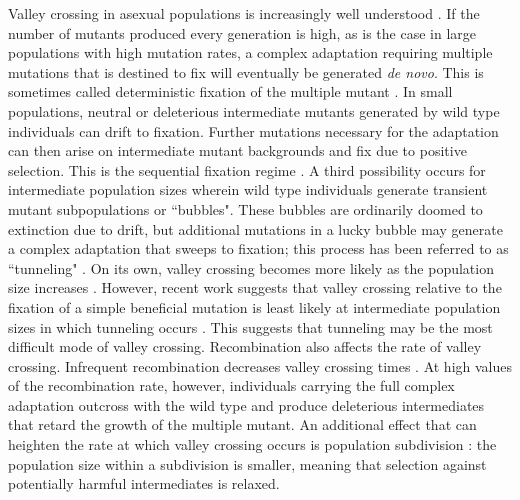 \documentclass[10pt,twocolumn,twoside]{gsajnl}
\begin{document}
\begin{spacing}{1.5}
Valley crossing in asexual populations is increasingly well understood \citep{weissman_2009}.
If the number of mutants produced every generation is high, as is the case in large populations with high mutation rates, a complex adaptation requiring multiple mutations that is destined to fix will eventually be generated \emph{de novo}.
This is sometimes called deterministic fixation of the multiple mutant \citep{weissman_2009}.
In small populations, neutral or deleterious intermediate mutants generated by wild type individuals can drift to fixation. Further mutations necessary for the adaptation can then arise on intermediate mutant backgrounds and fix due to positive selection.
This is the sequential fixation regime \citep{weissman_2009}.
A third possibility occurs for intermediate population sizes wherein wild type individuals generate transient mutant subpopulations or ``bubbles".
These bubbles are ordinarily doomed to extinction due to drift, but additional mutations in a lucky bubble may generate a complex adaptation that sweeps to fixation; this process has been referred to as ``tunneling" \citep{iwasa_2004, weissman_2009}.
On its own, valley crossing becomes more likely as the population size increases \citep{weissman_2009}. However, recent work suggests that valley crossing relative to the fixation of a simple beneficial mutation is least likely at intermediate population sizes in which tunneling occurs \citet{ochs_2015}. This suggests that tunneling may be the most difficult mode of valley crossing. 
Recombination also affects the rate of valley crossing.
Infrequent recombination decreases valley crossing times \citep{weissman_2010}.
At high values of the recombination rate, however, individuals carrying the full complex adaptation outcross with the wild type and produce deleterious intermediates that retard the growth of the multiple mutant.
An additional effect that can heighten the rate at which valley crossing occurs is population subdivision \citep{Bitbol:Schwab:2014}: the population size within a subdivision is smaller, meaning that selection against potentially harmful intermediates is relaxed.


\end{spacing}
\end{document}

